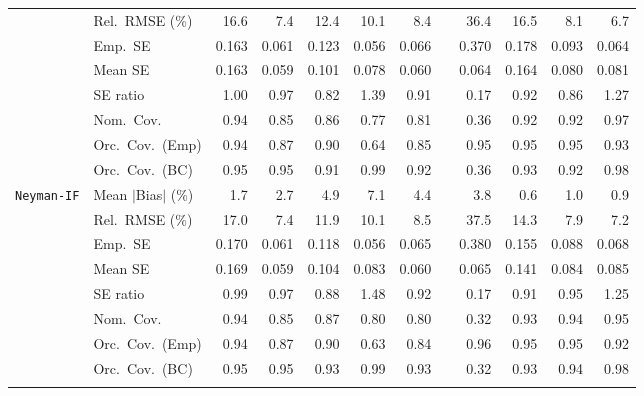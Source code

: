 \begin{landscape}
\begin{longtable}{llrrrrrrrrrr}
 & Rel.\ RMSE (\%) & 16.6 & \cellcolor{ranktwo}7.4 & 12.4 & 10.1 & 8.4 &  & 36.4 & 16.5 & \cellcolor{rankthree}8.1 & \cellcolor{rankone}6.7 \\
 & Emp.\ SE & 0.163 & 0.061 & 0.123 & 0.056 & 0.066 &  & 0.370 & 0.178 & 0.093 & 0.064 \\
 & Mean SE & 0.163 & 0.059 & 0.101 & 0.078 & 0.060 &  & 0.064 & 0.164 & 0.080 & 0.081 \\
 & SE ratio & \cellcolor{rankone}1.00 & \cellcolor{ranktwo}0.97 & 0.82 & 1.39 & 0.91 &  & 0.17 & \cellcolor{rankthree}0.92 & 0.86 & 1.27 \\
 & Nom.\ Cov. & \cellcolor{rankone}0.94 & 0.85 & 0.86 & 0.77 & 0.81 &  & 0.36 & \cellcolor{rankthree}0.92 & 0.92 & \cellcolor{ranktwo}0.97 \\
 & Orc.\ Cov.\ (Emp) & 0.94 & 0.87 & 0.90 & 0.64 & 0.85 &  & \cellcolor{rankone}0.95 & \cellcolor{rankthree}0.95 & \cellcolor{ranktwo}0.95 & 0.93 \\
 & Orc.\ Cov.\ (BC) & \cellcolor{rankone}0.95 & \cellcolor{ranktwo}0.95 & 0.91 & 0.99 & 0.92 &  & 0.36 & \cellcolor{rankthree}0.93 & 0.92 & 0.98 \\
\addlinespace[2pt]
\quad \texttt{Neyman-IF} & Mean $|$Bias$|$ (\%) & 1.7 & 2.7 & 4.9 & 7.1 & 4.4 &  & 3.8 & \cellcolor{rankone}0.6 & \cellcolor{rankthree}1.0 & \cellcolor{ranktwo}0.9 \\
 & Rel.\ RMSE (\%) & 17.0 & \cellcolor{ranktwo}7.4 & 11.9 & 10.1 & 8.5 &  & 37.5 & 14.3 & \cellcolor{rankthree}7.9 & \cellcolor{rankone}7.2 \\
 & Emp.\ SE & 0.170 & 0.061 & 0.118 & 0.056 & 0.065 &  & 0.380 & 0.155 & 0.088 & 0.068 \\
 & Mean SE & 0.169 & 0.059 & 0.104 & 0.083 & 0.060 &  & 0.065 & 0.141 & 0.084 & 0.085 \\
 & SE ratio & \cellcolor{rankone}0.99 & \cellcolor{ranktwo}0.97 & 0.88 & 1.48 & 0.92 &  & 0.17 & 0.91 & \cellcolor{rankthree}0.95 & 1.25 \\
 & Nom.\ Cov. & \cellcolor{ranktwo}0.94 & 0.85 & 0.87 & 0.80 & 0.80 &  & 0.32 & 0.93 & \cellcolor{rankthree}0.94 & \cellcolor{rankone}0.95 \\
 & Orc.\ Cov.\ (Emp) & 0.94 & 0.87 & 0.90 & 0.63 & 0.84 &  & \cellcolor{rankthree}0.96 & \cellcolor{rankone}0.95 & \cellcolor{ranktwo}0.95 & 0.92 \\
 & Orc.\ Cov.\ (BC) & \cellcolor{rankone}0.95 & \cellcolor{ranktwo}0.95 & 0.93 & 0.99 & 0.93 &  & 0.32 & 0.93 & \cellcolor{rankthree}0.94 & 0.98 \\
\addlinespace[2pt]

\end{longtable}
\end{landscape}
